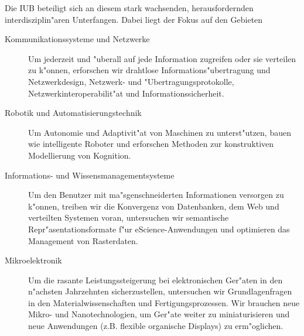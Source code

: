 \documentclass[11pt,a4paper]{article}
\begin{document}
Die IUB beteiligt sich an diesem stark wachsenden, herausfordernden interdisziplin"aren
Unterfangen. Dabei liegt der Fokus auf den Gebieten
\begin{description}
    \item[Kommunikationssysteme und Netzwerke] Um jederzeit und "uberall auf jede
     Information zugreifen oder sie verteilen zu k"onnen, erforschen wir drahtlose
  Informations"ubertragung und Netzwerkdesign, Netzwerk- und "Ubertragungsprotokolle,
  Netzwerkinteroperabilit"at und Informationssicherheit.
\item[Robotik und Automatisierungstechnik] Um Autonomie und Adaptivit"at von Maschinen zu
  unterst"utzen, bauen wie intelligente Roboter und erforschen Methoden zur konstruktiven Modellierung von Kognition.
\item[Informations- und Wissensmanagementsysteme] Um den Benutzer mit ma"sgenschneiderten
  Informationen versorgen zu k"onnen, treiben wir die Konvergenz von Datenbanken, dem Web
  und verteilten Systemen voran, untersuchen wir semantische Repr"asentationsformate f"ur
  eScience-Anwendungen und optimieren das Management von Rasterdaten.
\item[Mikroelektronik] Um die rasante Leistungssteigerung bei elektronischen Ger"aten in
  den n"achsten Jahrzehnten sicherzustellen, untersuchen wir Grundlagenfragen in den
  Materialwissenschaften und Fertigungsprozessen. Wir brauchen neue Mikro- und
  Nanotechnologien, um Ger"ate weiter zu miniaturisieren und neue Anwendungen
  (z.B. flexible organische Displays) zu erm"oglichen.
\end{description}
\end{document}
